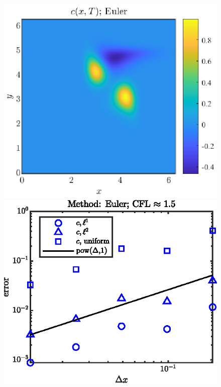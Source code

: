 \documentclass[11pt,letterpaper]{article}
\begin{document}
\begin{figure}[H]
    \centering
    \includegraphics{figs/c_final_Euler}
    \includegraphics{figs/conv_order_Euler}
    \caption{}\label{fig:c_final_Euler}
\end{figure}
\end{document}
